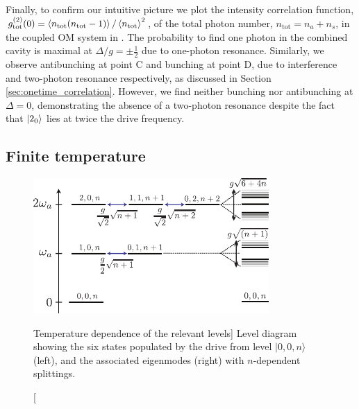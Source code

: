 Finally, to confirm our intuitive picture we plot the
intensity correlation function, 
$g^{(2)}_{\mathrm{tot}}(0) =
\left< n_{\mathrm{tot}}(n_{\mathrm{tot}}-1) \right>/\left< n_{\mathrm{tot}} \right>^2$,
of the total photon number, $n_{\mathrm{tot}} = n_a +
n_s$,
in the coupled OM system in
. 
The probability to find one photon in the combined
cavity is maximal at $\Delta/g=\pm \frac{1}{2}$ 
due to one-photon resonance.
Similarly, we  
observe antibunching at point C
and bunching at point D,
due  to interference and two-photon resonance
respectively,
as discussed 
in Section \ref{sec:onetime_correlation}.
However, we find neither bunching nor antibunching
at $\Delta = 0$, 
demonstrating the absence of a two-photon resonance
despite the fact that $| 2_0 \rangle$ lies at twice the
drive frequency.




 


\subsection{Finite temperature}

\begin{figure}
\centering
  \includegraphics[width=0.8\textwidth]{./figs_Komar2013/fig4a.pdf}
  \caption
  [Temperature dependence of the relevant levels]
  {
  \label{fig:thermal_g2_a}
  Level diagram showing the
  six states populated by the drive from level $|0,0,n\rangle$ (left), 
  and the associated
  eigenmodes (right) with $n$-dependent splittings.
}
\end{figure} 

